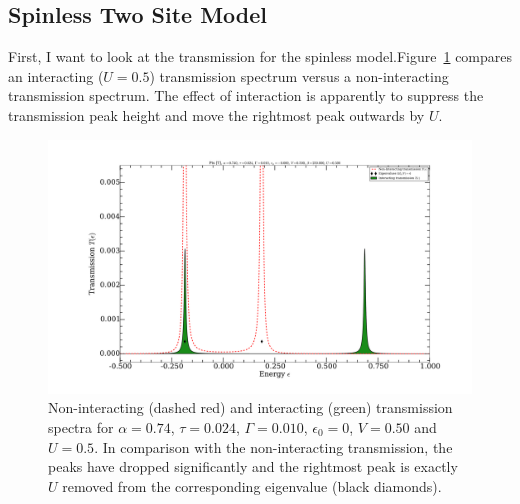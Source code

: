 \subsection{Spinless Two Site Model}
First, I want to look at the transmission for the spinless model.Figure~\ref{fig:spinlesstransmission} compares an interacting ($U=0.5$) transmission spectrum versus a non-interacting transmission spectrum. The effect of interaction is apparently to suppress the transmission peak height and move the rightmost peak outwards by $U$. 
\begin{figure}[htb]
    \centering
    \includegraphics[height=.35\textheight,clip=true,trim=5cm 2cm 4cm 3cm]{pdf/trans/perrin_two_site.pdf}
    \caption{Non-interacting (dashed red) and interacting (green) transmission spectra for $\alpha=0.74$, $\tau=0.024$, $\Gamma=0.010$, $\epsilon_0 = 0$, $V=0.50$ and $U=0.5$. In comparison with the non-interacting transmission, the peaks have dropped significantly and the rightmost peak is exactly $U$ removed from the corresponding eigenvalue (black diamonds).}
    \label{fig:spinlesstransmission}
\end{figure}

